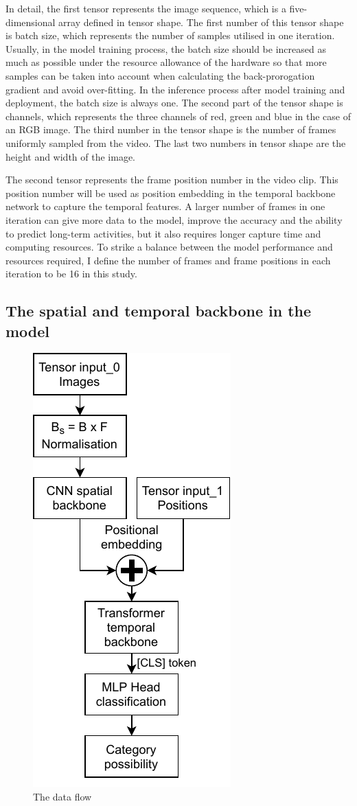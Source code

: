In detail, the first tensor represents the image sequence, which is a five-dimensional array defined in tensor shape.
The first number of this tensor shape is batch size, which represents the number of samples utilised in one iteration.
Usually, in the model training process, the batch size should be increased as much as possible under the resource allowance of the hardware so that more samples can be taken into account when calculating the back-prorogation gradient and avoid over-fitting.
In the inference process after model training and deployment, the batch size is always one.
The second part of the tensor shape is channels, which represents the three channels of red, green and blue in the case of an RGB image.
The third number in the tensor shape is the number of frames uniformly sampled from the video.
The last two numbers in tensor shape are the height and width of the image.

The second tensor represents the frame position number in the video clip.
This position number will be used as position embedding in the temporal backbone network to capture the temporal features.
A larger number of frames in one iteration can give more data to the model, improve the accuracy and the ability to predict long-term activities, but it also requires longer capture time and computing resources.
To strike a balance between the model performance and resources required, I define the number of frames and frame positions in each iteration to be 16 in this study.

\subsection{The spatial and temporal backbone in the model}
\begin{figure}
    \vspace*{-1.2em}
    \centering
    \includegraphics[width=.32\textwidth]{design/imgs/3-model-dataflow.pdf}
    \caption{The data flow}
    \label{fig:3-model-dataflow}
\end{figure}


